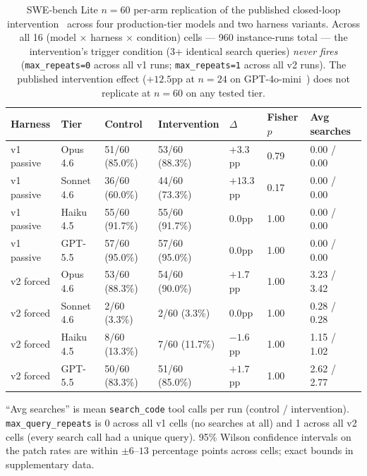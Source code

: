 \documentclass[journal]{IEEEtran}
\begin{document}
\begin{table}[t]
\centering
\caption{SWE-bench Lite $n{=}60$ per-arm replication of the published closed-loop intervention~\cite{aiware2026} across four production-tier models and two harness variants. Across all 16 (model $\times$ harness $\times$ condition) cells — 960 instance-runs total — the intervention's trigger condition (3+ identical search queries) \emph{never fires} (\texttt{max\_repeats=0} across all v1 runs; \texttt{max\_repeats=1} across all v2 runs). The published intervention effect ($+12.5$pp at $n{=}24$ on GPT-4o-mini~\cite{aiware2026}) does not replicate at $n{=}60$ on any tested tier.}
\label{tab:results}
\small
\begin{tabular}{@{}lllllll@{}}
\toprule
\textbf{Harness} & \textbf{Tier} & \textbf{Control} & \textbf{Intervention} & \textbf{$\Delta$} & \textbf{Fisher $p$} & \textbf{Avg searches} \\
\midrule
v1 passive & Opus 4.6 & 51/60 (85.0\%) & 53/60 (88.3\%) & $+3.3$pp & 0.79 & 0.00 / 0.00 \\
v1 passive & Sonnet 4.6 & 36/60 (60.0\%) & 44/60 (73.3\%) & $+13.3$pp & 0.17 & 0.00 / 0.00 \\
v1 passive & Haiku 4.5 & 55/60 (91.7\%) & 55/60 (91.7\%) & $0.0$pp & 1.00 & 0.00 / 0.00 \\
v1 passive & GPT-5.5 & 57/60 (95.0\%) & 57/60 (95.0\%) & $0.0$pp & 1.00 & 0.00 / 0.00 \\
\midrule
v2 forced & Opus 4.6 & 53/60 (88.3\%) & 54/60 (90.0\%) & $+1.7$pp & 1.00 & 3.23 / 3.42 \\
v2 forced & Sonnet 4.6 & 2/60 (3.3\%) & 2/60 (3.3\%) & $0.0$pp & 1.00 & 0.28 / 0.28 \\
v2 forced & Haiku 4.5 & 8/60 (13.3\%) & 7/60 (11.7\%) & $-1.6$pp & 1.00 & 1.15 / 1.02 \\
v2 forced & GPT-5.5 & 50/60 (83.3\%) & 51/60 (85.0\%) & $+1.7$pp & 1.00 & 2.62 / 2.77 \\
\bottomrule
\end{tabular}
\par\smallskip\noindent
\footnotesize
``Avg searches'' is mean \texttt{search\_code} tool calls per run (control / intervention). \texttt{max\_query\_repeats} is 0 across all v1 cells (no searches at all) and 1 across all v2 cells (every search call had a unique query). 95\% Wilson confidence intervals on the patch rates are within $\pm 6$--$13$ percentage points across cells; exact bounds in supplementary data.
\end{table}
\end{document}
